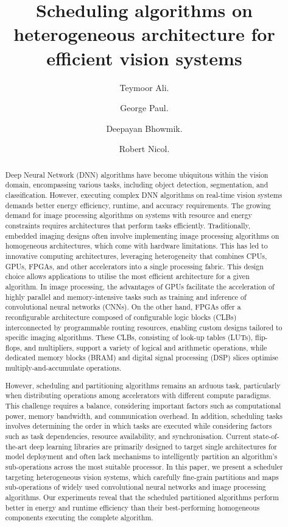 \documentclass[]{spie}  %
\title{Scheduling algorithms on heterogeneous architecture for efficient vision systems }
\author[a,b]{Teymoor Ali. }
\author[a,b]{George Paul. }
\author[a]{Deepayan Bhowmik.}
\author[b]{Robert Nicol.}
\affil[a]{Newcastle University, 1 Science Square, Newcastle upon Tyne, U.K}
\affil[b]{STMicroelectronics, 1 Tanfield, Inverleith Row, Edinburgh, U.K}
\begin{document}
 
\maketitle

\begin{abstract}
Deep Neural Network (DNN) algorithms have become ubiquitous within the vision domain, encompassing various tasks, including object detection, segmentation, and classification. However, executing complex DNN algorithms on real-time vision systems demands better energy efficiency, runtime, and accuracy requirements. The growing demand for image processing algorithms on systems with resource and energy constraints requires architectures that perform tasks efficiently. Traditionally, embedded imaging designs often involve implementing image processing algorithms on homogeneous architectures, which come with hardware limitations. This has led to innovative computing architectures, leveraging heterogeneity that combines CPUs, GPUs, FPGAs, and other accelerators into a single processing fabric. This design choice allows applications to utilise the most efficient architecture for a given algorithm. In image processing, the advantages of GPUs facilitate the acceleration of highly parallel and memory-intensive tasks such as training and inference of convolutional neural networks (CNNs). On the other hand, FPGAs offer a reconfigurable architecture composed of configurable logic blocks (CLBs) interconnected by programmable routing resources, enabling custom designs tailored to specific imaging algorithms. These CLBs, consisting of look-up tables (LUTs), flip-flops, and multipliers, support a variety of logical and arithmetic operations, while dedicated memory blocks (BRAM) and digital signal processing (DSP) slices optimise multiply-and-accumulate operations.

However, scheduling and partitioning algorithms remains an arduous task, particularly when distributing operations among accelerators with different compute paradigms. This challenge requires a balance, considering important factors such as computational power, memory bandwidth, and communication overhead. In addition, scheduling tasks involves determining the order in which tasks are executed while considering factors such as task dependencies, resource availability, and synchronisation. Current state-of-the-art deep learning libraries are primarily designed to target single architectures for model deployment and often lack mechanisms to intelligently partition an algorithm's sub-operations across the most suitable processor. In this paper, we present a scheduler targeting heterogeneous vision systems, which carefully fine-grain partitions and maps sub-operations of widely used convolutional neural networks and image processing algorithms. Our experiments reveal that the scheduled partitioned algorithms perform better in energy and runtime efficiency than their best-performing homogeneous components executing the complete algorithm.
\end{abstract}
\end{document}
